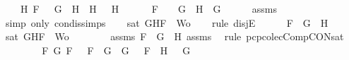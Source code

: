 \begin{isabellebody}
\ \ \ \ {\isacharparenleft}{\isasymexists}H{}{\isachardot}\ F\ {\isacharequal}\ \isactrlbold {\isasymnot}\ {\isacharparenleft}G\ \isactrlbold {\isasymrightarrow}\ H{}{\isacharparenright}\ {\isasymand}\ H\ {\isacharequal}\ \isactrlbold {\isasymnot}\ H{}{\isacharparenright}\ {\isasymor}\ \isanewline
\ \ \ \ F\ {\isacharequal}\ \isactrlbold {\isasymnot}\ {\isacharparenleft}\isactrlbold {\isasymnot}\ G{\isacharparenright}\ {\isasymand}\ H\ {\isacharequal}\ G{\isachardoublequoteclose}\isanewline
\ \ \ \ \isamarkupfalse%
\ assms{\isacharparenleft}{}{\isacharparenright}\ \isamarkupfalse%
\ {\isacharparenleft}simp\ only{\isacharcolon}\ con{\isacharunderscore}dis{\isacharunderscore}simps{\isacharparenleft}{}{\isacharparenright}{\isacharparenright}\isanewline
\ \ \isamarkupfalse%
\ {\isachardoublequoteopen}sat\ {\isacharparenleft}{\isacharbraceleft}G{\isacharcomma}H{\isacharcomma}F{\isacharbraceright}\ {\isasymunion}\ Wo{\isacharparenright}{\isachardoublequoteclose}\isanewline
\ \ \isamarkupfalse%
\ {\isacharparenleft}rule\ disjE{\isacharparenright}\isanewline
\ \ \ \ \isamarkupfalse%
\ {\isachardoublequoteopen}F\ {\isacharequal}\ G\ \isactrlbold {\isasymand}\ H{\isachardoublequoteclose}\isanewline
\ \ \ \ \isamarkupfalse%
\ {\isachardoublequoteopen}sat\ {\isacharparenleft}{\isacharbraceleft}G{\isacharcomma}H{\isacharcomma}F{\isacharbraceright}\ {\isasymunion}\ Wo{\isacharparenright}{\isachardoublequoteclose}\isanewline
\ \ \ \ \ \ \isamarkupfalse%
\ assms{\isacharparenleft}{}{\isacharparenright}\ {\isacartoucheopen}F\ {\isacharequal}\ G\ \isactrlbold {\isasymand}\ H{\isacartoucheclose}\ assms{\isacharparenleft}{}{\isacharcomma}{}{\isacharcomma}{}{\isacharparenright}\ \isamarkupfalse%
\ {\isacharparenleft}rule\ pcp{\isacharunderscore}colecComp{\isacharunderscore}CON{\isacharunderscore}sat{}{\isacharparenright}\isanewline
\ \ \isamarkupfalse%
\isanewline
\ \ \ \ \isamarkupfalse%
\ {\isachardoublequoteopen}{\isacharparenleft}{\isasymexists}F{}\ G{}{\isachardot}\ F\ {\isacharequal}\ \isactrlbold {\isasymnot}\ {\isacharparenleft}F{}\ \isactrlbold {\isasymor}\ G{}{\isacharparenright}\ {\isasymand}\ G\ {\isacharequal}\ \isactrlbold {\isasymnot}\ F{}\ {\isasymand}\ H\ {\isacharequal}\ \isactrlbold {\isasymnot}\ G{}{\isacharparenright}\ {\isasymor}\ \isanewline

\end{isabellebody}

